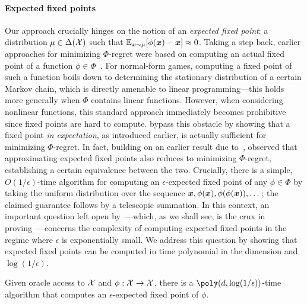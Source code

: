 \paragraph{Expected fixed points} Our approach crucially hinges on the notion of an \emph{expected fixed point}: a distribution $\mu \in \Delta({\mathcal{X}})$ such that $\operatorname*{\mathbb E}_{{\bm{x}} \sim \mu} [ \phi({\bm{x}}) - {\bm{x}}] \approx 0$. Taking a step back, earlier approaches for minimizing $\Phi$-regret were based on computing an actual fixed point of a function $\phi \in \Phi$~\citep{Gordon08:No,Blum07:From,Stoltz05:Internal}. For normal-form games, computing a fixed point of such a function boils down to determining the stationary distribution of a certain Markov chain, which is directly amenable to linear programming---this holds more generally when $\Phi$ contains linear functions. However, when considering nonlinear functions, this standard approach immediately becomes prohibitive since fixed points are hard to compute. \citet{Zhang24:Efficient} bypass this obstacle by showing that a fixed point \emph{in expectation}, as introduced earlier, is actually sufficient for minimizing $\Phi$-regret. In fact, building on an earlier result due to~\citet{Hazan07:Computational}, \citet{Zhang24:Efficient} observed that approximating expected fixed points also reduces to minimizing $\Phi$-regret, establishing a certain equivalence between the two. Crucially, there is a simple, $O(1/\epsilon)$-time algorithm for computing an $\epsilon$-expected fixed point of any $\phi \in \Phi$ by taking the uniform distribution over the sequence ${\bm{x}}, \phi({\bm{x}}), \phi(\phi({\bm{x}})), \dots$; the claimed guarantee follows by a telescopic summation. In this context, an important question left open by~\citet{Zhang24:Efficient}---which, as we shall see, is the crux in proving~---concerns the complexity of computing expected fixed points in the regime where $\epsilon$ is exponentially small. We address this question by showing that expected fixed points can be computed in time polynomial in the dimension and $\log(1/\epsilon)$.

\begin{theorem}
    \label{theorem:efps}
    Given oracle access to ${\mathcal{X}}$ and $\phi : {\mathcal{X}} \to {\mathcal{X}}$, there is a $\poly(d, \log(1/\epsilon))$-time algorithm that computes an $\epsilon$-expected fixed point of $\phi$.
\end{theorem}

